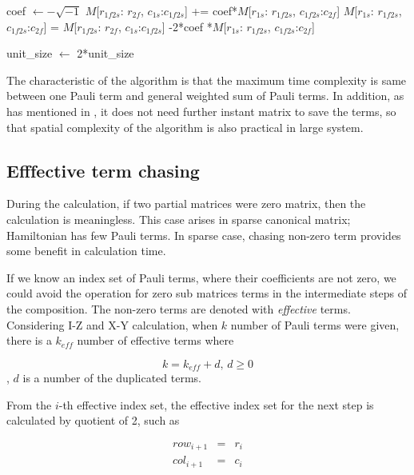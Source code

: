 \documentclass[twocolumn]{article}
\begin{document}
\begin{algorithm}
\begin{algorithmic}
                \State coef $\gets - \sqrt{-1}$ 
                \State $M$[$r_{1f2s}$: $r_{2f}$, $c_{1s}$:$c_{1f2s}$] += coef*$M$[$r_{1s}$: $r_{1f2s}$, $c_{1f2s}$:$c_{2f}$]
                \State $M$[$r_{1s}$: $r_{1f2s}$, $c_{1f2s}$:$c_{2f}$] = $M$[$r_{1f2s}$: $r_{2f}$, $c_{1s}$:$c_{1f2s}$] -2*coef *$M$[$r_{1s}$: $r_{1f2s}$, $c_{1f2s}$:$c_{2f}$]
                
                \EndFor
            \EndFor
            \State unit\_size $\gets$ 2*unit\_size
        \EndFor
    \end{algorithmic}
\end{algorithm}

The characteristic of the algorithm is that 
the maximum time complexity is same between one Pauli term and general weighted sum of Pauli terms.
In addition, as has mentioned in \cite{Hantzko_2024}, it does not need further 
instant matrix to save the terms, so that spatial complexity of the algorithm is also practical 
in large system.

\subsection{Efffective term chasing}

During the calculation, if two partial matrices were zero matrix, then 
the calculation is meaningless. This case arises in sparse canonical matrix; 
Hamiltonian has few Pauli terms.
In sparse case, chasing non-zero term provides some benefit in calculation time.

If we know an index set of Pauli terms, where their coefficients are not zero,
we could avoid the operation for zero sub matrices terms in the intermediate steps of the composition.
The non-zero terms are denoted with \textit{effective} terms. 
Considering I-Z and X-Y calculation, when $k$ number of Pauli terms were given, 
there is a $k_{eff}$ number of effective terms where

\begin{equation}
    k = k_{eff} + d,\, d \geq 0
\end{equation}, $d$ is a number of the duplicated terms.

From the $i$-th effective index set, the effective index set for the next step is calculated by
quotient of 2, such as 

\begin{equation}
    \label{eq:term_chasing}
    \begin{array}{ccc}
        row_{i+1}&=& r_i \\
        col_{i+1}&=& c_i
    \end{array}
\end{equation}
\end{document}
